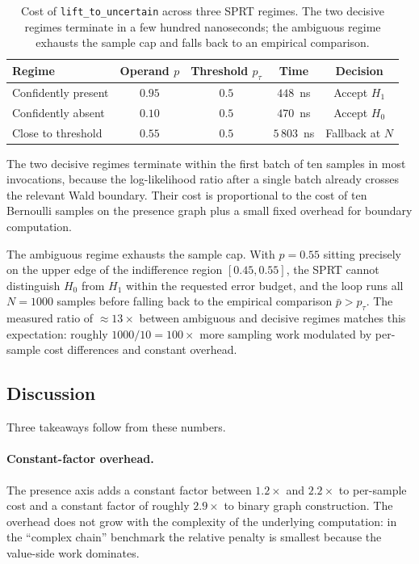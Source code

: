 \begin{table}[h]
\centering
\small
\begin{tabular}{@{}lcccc@{}}
\toprule
Regime & Operand $p$ & Threshold $p_\tau$ & Time & Decision \\
\midrule
Confidently present     & $0.95$ & $0.5$ & $448$~ns  & Accept $H_1$ \\
Confidently absent      & $0.10$ & $0.5$ & $470$~ns  & Accept $H_0$ \\
Close to threshold      & $0.55$ & $0.5$ & $5\,803$~ns & Fallback at $N$ \\
\bottomrule
\end{tabular}
\caption{Cost of \texttt{lift\_to\_uncertain} across three SPRT regimes.
The two decisive regimes terminate in a few hundred nanoseconds; the
ambiguous regime exhausts the sample cap and falls back to an empirical
comparison.}
\label{tab:sprt}
\end{table}

The two decisive regimes terminate within the first batch of ten samples
in most invocations, because the log-likelihood ratio after a single
batch already crosses the relevant Wald boundary. Their cost is
proportional to the cost of ten Bernoulli samples on the presence graph
plus a small fixed overhead for boundary computation.

The ambiguous regime exhausts the sample cap. With $p = 0.55$ sitting
precisely on the upper edge of the indifference region $[0.45, 0.55]$, the
SPRT cannot distinguish $H_0$ from $H_1$ within the requested error budget,
and the loop runs all $N = 1000$ samples before falling back to the
empirical comparison $\bar{p} > p_\tau$. The measured ratio of
$\approx 13\times$ between ambiguous and decisive regimes matches this
expectation: roughly $1000/10 = 100\times$ more sampling work modulated
by per-sample cost differences and constant overhead.

\subsection{Discussion}
\label{sec:eval:discussion}

Three takeaways follow from these numbers.

\paragraph{Constant-factor overhead.} The presence axis adds a constant
factor between $1.2\times$ and $2.2\times$ to per-sample cost and a
constant factor of roughly $2.9\times$ to binary graph construction. The
overhead does not grow with the complexity of the underlying computation:
in the ``complex chain'' benchmark the relative penalty is smallest
because the value-side work dominates.

